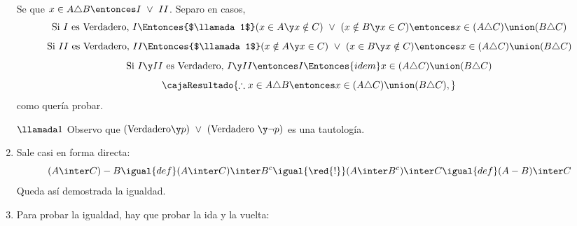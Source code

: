 \begin{enumerate}[label=\roman*)]
        Se que $x \in A \triangle B \entonces I ~\lor~ II$. Separo en casos,
        $$
          \text{Si }I\text{ es Verdadero, }I \Entonces{$\llamada1$} (x \in A \y x \notin C) ~\lor~ (x \notin B \y x \in C) \entonces x \in (A \triangle C) \union (B \triangle C)   \\
        $$
        $$
          \text{Si }II\text{ es Verdadero, }II \Entonces{$\llamada1$} (x \notin A \y x \in C) ~\lor~ (x \in B \y x \notin C) \entonces x \in (A \triangle C) \union (B \triangle C) \\
        $$
        $$
          \text{Si }I \y II\text{ es Verdadero, }I \y II \entonces I
          \Entonces{idem}
          x \in (A \triangle C) \union (B \triangle C)
        $$
        $$
          \cajaResultado{
            \therefore x \in A \triangle B \entonces x \in (A \triangle C) \union (B \triangle C),
          }
        $$
        como quería probar.

        $\llamada1$ Observo que $(\text{Verdadero} \y p) ~\lor~ (\text{Verdadero } \y \neg p)$ es una tautología.

  \item Sale casi en forma directa:
        $$
          (A \inter C) - B
          \igual{def}
          (A \inter C) \inter B^c
          \igual{\red{!}}
          (A \inter B^c) \inter C
          \igual{def}
          (A - B) \inter C
        $$
        Queda así demostrada la igualdad.

  \item Para probar la igualdad, hay que probar la ida y la vuelta:
\end{enumerate}
